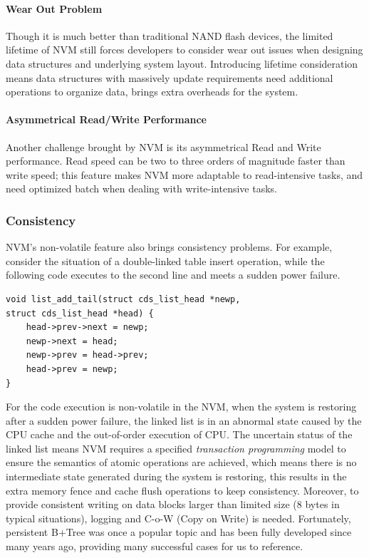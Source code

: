 \paragraph{Wear Out Problem}
Though it is much better than traditional NAND flash devices, the limited lifetime of NVM still forces developers to consider wear out issues when designing data structures and underlying system layout\cite{dulloor2014system,van2018managing}. Introducing lifetime consideration means data structures with massively update requirements need additional operations to organize data, brings extra overheads for the system. 

\paragraph{Asymmetrical Read/Write Performance}
Another challenge brought by NVM is its asymmetrical Read and Write performance\cite{wu2017early}. Read speed can be two to three orders of magnitude faster than write speed; this feature makes NVM more adaptable to read-intensive tasks, and need optimized batch when dealing with write-intensive tasks.


\subsubsection{Consistency}\label{sec:8bytes-law}

NVM's non-volatile feature also brings consistency problems. For example, consider the situation of a double-linked table insert operation, while the following code executes to the second line and meets a sudden power failure.
\begin{verbatim}
void list_add_tail(struct cds_list_head *newp,
struct cds_list_head *head) {
	head->prev->next = newp;
	newp->next = head;
	newp->prev = head->prev;
	head->prev = newp;
}
\end{verbatim}
For the code execution is non-volatile in the NVM, when the system is restoring after a sudden power failure, the linked list is in an abnormal state caused by the CPU cache and the out-of-order execution of CPU. The uncertain status of the linked list means NVM requires a specified \textit{transaction programming} model\cite{volos2011mnemosyne,dulloor2014system,ren2015thynvm,188438} to ensure the semantics of atomic operations are achieved, which means there is no intermediate state generated during the system is restoring, this results in the extra memory fence and cache flush operations to keep consistency. Moreover, to provide consistent writing on data blocks larger than limited size (8 bytes in typical situations), logging and C-o-W (Copy on Write) is needed. Fortunately, persistent B+Tree\cite{188438,oukid2016fptree} was once a popular topic and has been fully developed since many years ago, providing many successful cases for us to reference.

